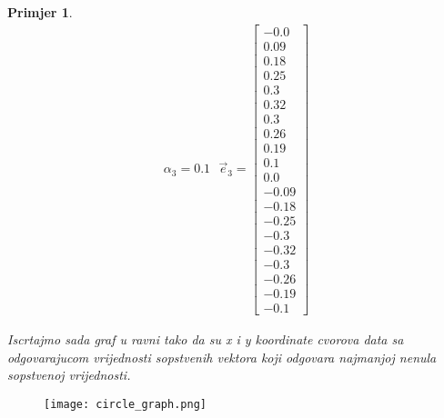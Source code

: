 \documentclass[11pt]{article}
\newtheorem{example}{Primjer}
\begin{document}
\begin{example}
\[\begin{split}
                 \alpha_3=0.1  \text{  } \vec{e}_3 = \begin{bmatrix} -0.0 \\ 0.09 \\ 0.18 \\ 0.25 \\ 0.3 \\ 0.32 \\ 0.3 \\ 0.26 \\ 0.19 \\ 0.1 \\ 0.0 \\ -0.09 \\ -0.18 \\ -0.25 \\ -0.3 \\ -0.32 \\ -0.3 \\ -0.26 \\ -0.19 \\ -0.1 \end{bmatrix}
              \end{split}
              \]
              
              Iscrtajmo sada graf u ravni tako da su x i y koordinate cvorova data sa odgovarajucom vrijednosti sopstvenih vektora koji odgovara najmanjoj nenula sopstvenoj vrijednosti.
              
            \end{example}
            
            \begin{figure}[h]
                \centering
                \texttt{[image: circle\_graph.png]}
            \end{figure}
            
\end{document}
